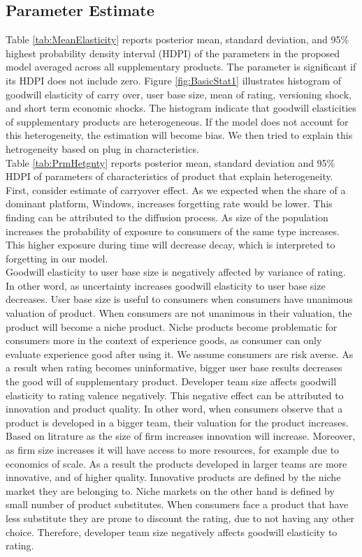 \documentclass[mksc,nonblindrev]{informs3}
\begin{document}
\subsection{Parameter Estimate}
\indent Table \ref{tab:MeanElasticity} reports posterior mean, standard deviation, and 95\% highest probability density interval (HDPI) of the parameters in the proposed model averaged across all supplementary products. The parameter is significant if its HDPI does not include zero. Figure \ref{fig:BasicStat1} illustrates histogram of goodwill elasticity of carry over, user base size, mean of rating, versioning shock, and short term economic shocks. The histogram indicate that goodwill elasticities of supplementary products are heterogeneous. If the model does not account for this heterogeneity, the estimation will become bias. We then tried to explain this hetrogeneity based on plug in characteristics. \\
\indent Table \ref{tab:PrmHetgnty} reports posterior mean, standard deviation and 95\% HDPI of parameters of characteristics of product that explain heterogeneity. First, consider estimate of carryover effect. As we expected when the share of a dominant platform, Windows, increases forgetting rate would be lower. This finding can be attributed to the diffusion process. As size of the population increases the probability of exposure to consumers of the same type increases. This higher exposure during time will decrease decay, which is interpreted to forgetting in our model. \\
\indent Goodwill elasticity to user base size is negatively affected by variance of rating. In other word, as uncertainty increases goodwill elasticity to user base size decreases. User base size is useful to consumers when consumers have unanimous valuation of product. When consumers are not unanimous in their valuation, the product will become a niche product. Niche products become problematic for consumers more in the context of experience goods, as consumer can only evaluate experience good after using it. We assume consumers are risk averse. As a result when rating becomes uninformative, bigger user base results decreases the good will of supplementary product.
\indent Developer team size affects goodwill elasticity to rating valence negatively. This negative effect can be attributed to innovation and product quality. In other word, when consumers observe that a product is developed in a bigger team, their valuation for the product increases. Based on litrature as the size of firm increases innovation will increase. Moreover, as firm size increases it will have access to more resources, for example due to economics of scale. As a result the products developed in larger teams are more innovative, and of higher quality. Innovative products are defined by the niche market they are belonging to. Niche markets on the other hand is defined by small number of product substitutes. When consumers face a product that have less substitute they are prone to discount the rating, due to not having any other choice. Therefore, developer team size negatively affects goodwill elasticity to rating.
\end{document}
